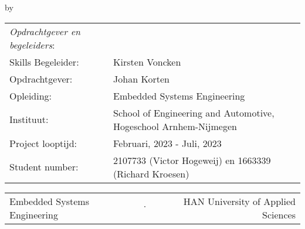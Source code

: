 \begin{titlepage}

\begin{center}

{\makeatletter
\largetitlestyle\fontsize{45}{45}\selectfont\@title
\makeatother}

\bigskip

{\makeatletter
\vspace{12mm}
\ifdefvoid{\@subtitle}{}{\largetitlestyle\fontsize{20}{20}\selectfont\@subtitle}
\makeatother}

\bigskip
\bigskip

by

\bigskip
\bigskip

{\makeatletter
\largetitlestyle\fontsize{25}{25}\selectfont\@author
\makeatother}

\bigskip
\bigskip



\vfill

\begin{tabular}{ll}
\textit{Opdrachtgever en begeleiders}:      & \\
Skills Begeleider:                          & Kirsten Voncken \\ 
Opdrachtgever:                    & Johan Korten \\
Opleiding:                          & Embedded Systems Engineering \\
Instituut:                          & School of Engineering and Automotive, Hogeschool Arnhem-Nijmegen\\
Project looptijd: & Februari, 2023 - Juli, 2023 \\
Student number: & 2107733 (Victor Hogeweij) en 1663339 (Richard Kroesen)\\
\end{tabular}

\vspace*{1cm}


\vspace*{2cm}
  \begin{center}
    \begin{tabular}{lcr}
      Embedded Systems Engineering & $\cdot$ & HAN University of Applied Sciences
    \end{tabular}
  \end{center}

\end{center}

\end{titlepage}
